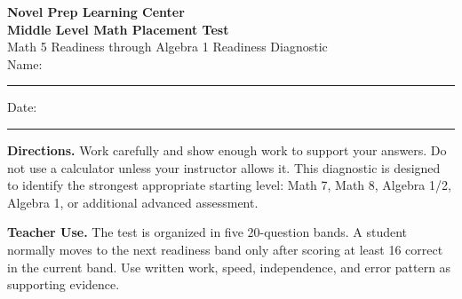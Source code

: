 \documentclass[11pt]{article}
\newcommand{\ansline}{\rule{2.25in}{0.4pt}}
\begin{document}
\begin{center}
  {\Large\bfseries\textcolor{npInk}{Novel Prep Learning Center}}\\[0.12cm]
  {\LARGE\bfseries\textcolor{npDeep}{Middle Level Math Placement Test}}\\[0.12cm]
  {\large Math 5 Readiness through Algebra 1 Readiness Diagnostic}\\[0.45cm]
  Name:\ \ansline \hfill Date:\ \ansline
\end{center}

\begin{titlebox}
\textbf{Directions.} Work carefully and show enough work to support your answers. Do not use a calculator unless your instructor allows it. This diagnostic is designed to identify the strongest appropriate starting level: Math 7, Math 8, Algebra 1/2, Algebra 1, or additional advanced assessment.
\end{titlebox}

\begin{guidebox}
\textbf{Teacher Use.} The test is organized in five 20-question bands. A student normally moves to the next readiness band only after scoring at least 16 correct in the current band. Use written work, speed, independence, and error pattern as supporting evidence.
\end{guidebox}
\end{document}
